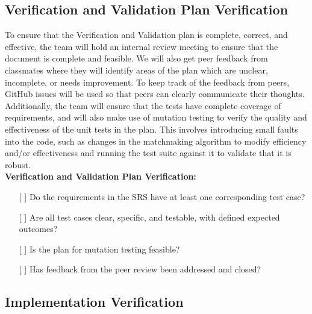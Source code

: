 \documentclass[12pt, titlepage]{article}
\begin{document}
\subsection{Verification and Validation Plan Verification}

To ensure that the Verification and Validation plan is complete, correct, and effective, the team will hold an internal review meeting to ensure that the document is complete and feasible. We will also get peer feedback from classmates where they will identify areas of the plan which are unclear, incomplete, or needs improvement. 
To keep track of the feedback from peers, GitHub issues will be used so that peers can clearly communicate their thoughts. Additionally, the team will ensure that the tests have complete coverage of requirements, and will also make use of mutation testing to verify the quality and effectiveness of the unit tests in the plan. 
This involves introducing small faults into the code, such as changes in the matchmaking algorithm to modify efficiency and/or effectiveness and running the test suite against it to validate that it is robust. \\

\noindent \textbf{Verification and Validation Plan Verification:}
\begin{itemize}
  \item[{[ ]}] Do the requirements in the SRS have at least one corresponding test case?
  \item[{[ ]}] Are all test cases clear, specific, and testable, with defined expected outcomes? 
  \item[{[ ]}] Is the plan for mutation testing feasible?
  \item[{[ ]}] Has feedback from the peer review been addressed and closed? 
\end{itemize}
\subsection{Implementation Verification}
\end{document}
